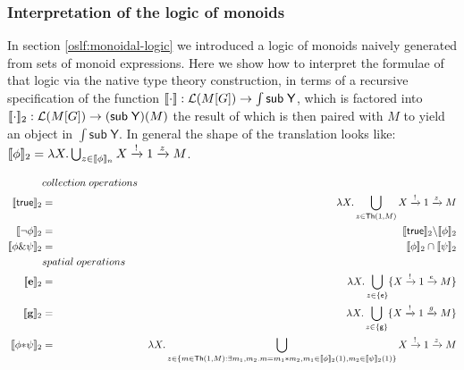 


\subsubsection{Interpretation of the logic of monoids}

In section \ref{oslf:monoidal-logic} we introduced a logic of monoids
naively generated from sets of monoid expressions. Here we show how to
interpret the formulae of that logic via the native type theory
construction, in terms of a recursive specification of the function $[\![ \cdot ]\!] : \mathcal{L}(M[G]) \to \int \mathsf{sub} \; \mathsf{Y}$, which is factored into $[\![ \cdot ]\!]_{2} : \mathcal{L}(M[G]) \to (\mathsf{sub} \; \mathsf{Y})(M)$ the result of which is then paired with $M$ to yield an object in $\int \mathsf{sub} \; \mathsf{Y}$. In general the shape of the translation looks like: $[\![ \mathsf{\phi} ]\!]_2  =  \lambda X.\bigcup_{z \in [\![ \mathsf{\phi} ]\!]_{n}} X \xrightarrow{!} 1 \xrightarrow{z} M$.

\begin{eqnarray*}
  & collection \; operations & \\
  \meaningof{\mathsf{true}}_{2} & = & \lambda X.\bigcup_{z \in \mathsf{Th}(1,M)} X \xrightarrow{!} 1 \xrightarrow{z} M \\
  \meaningof{\neg \phi}_{2} & = & \meaningof{\mathsf{true}}_{2} \backslash \meaningof{\phi}_{2} \\
  \meaningof{\phi \& \psi}_{2} & = & \meaningof{\phi}_{2} \cap \meaningof{\psi}_{2} \\
  & spatial \; operations & \\
  \meaningof{\mathbf{e}}_{2} & = & \lambda X.\bigcup_{z \in \{\mathsf{e}\}} \{ X \xrightarrow{!} 1 \xrightarrow{e} M \} \\
  \meaningof{\mathbf{g}}_{2} & = & \lambda X.\bigcup_{z \in \{\mathsf{g}\}} \{ X \xrightarrow{!} 1 \xrightarrow{g} M \} \\
  \meaningof{\phi \mathbf{*} \psi}_{2} & = & \lambda X.\bigcup_{ z \in \{ m \in \mathsf{Th}(1,M) : \exists m_{1}, m_{2}.m = m_{1} \mathsf{*} m_{2}, m_{1} \in \meaningof{\phi}_{2}(1), m_{2} \in \meaningof{\psi}_{2}(1) \}} X \xrightarrow{!} 1 \xrightarrow{z} M
\end{eqnarray*}


